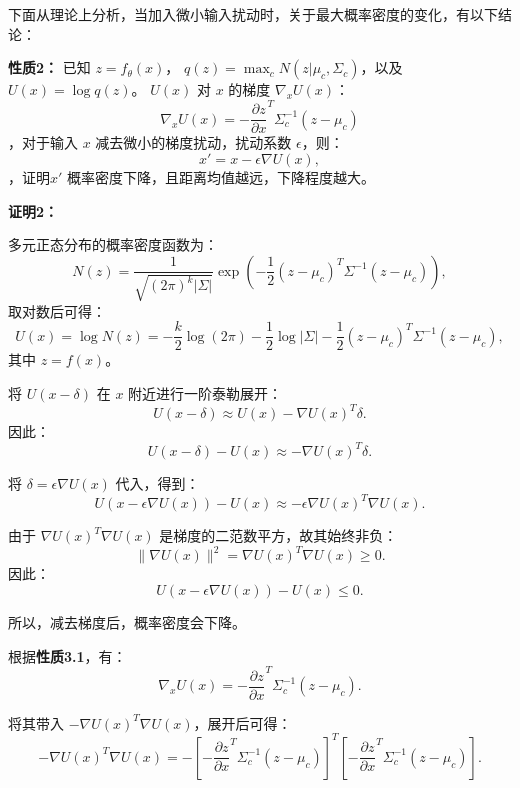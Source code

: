 

下面从理论上分析，当加入微小输入扰动时，关于最大概率密度的变化，有以下结论：

\textbf{性质2：}
已知 \( z = f_\theta(x) \)， \( q(z) = \max_c N(z|\mu_c, \Sigma_c) \)，以及 \( U(x) = \log q(z) \)。 \( U(x) \) 对 \( x \) 的梯度 \( \nabla_x U(x) \)：\[
\nabla_x U(x) = - \frac{\partial z}{\partial x}^T \Sigma_c^{-1} \left( z - \mu_c \right)
\]，对于输入 \( x \) 减去微小的梯度扰动，扰动系数 \( \epsilon \)，则：
\[
x' = x - \epsilon \nabla U(x),
\]，证明\( x' \) 概率密度下降，且距离均值越远，下降程度越大。

\textbf{证明2：}

多元正态分布的概率密度函数为：
\[
N(z) = \frac{1}{\sqrt{(2\pi)^k |\Sigma|}} \exp\left(-\frac{1}{2}(z - \mu_c)^T \Sigma^{-1} (z - \mu_c)\right),
\]
取对数后可得：
\[
U(x) = \log N(z) = -\frac{k}{2} \log(2\pi) - \frac{1}{2} \log |\Sigma| - \frac{1}{2} (z - \mu_c)^T \Sigma^{-1} (z - \mu_c),
\]
其中 \( z = f(x) \)。

将 \( U(x-\delta) \) 在 \( x \) 附近进行一阶泰勒展开：
\[
U(x-\delta) \approx U(x) - \nabla U(x)^T \delta.
\]
因此：
\[
U(x-\delta) - U(x) \approx - \nabla U(x)^T \delta.
\]

将 \( \delta = \epsilon \nabla U(x) \) 代入，得到：
\[
U(x-\epsilon \nabla U(x)) - U(x) \approx - \epsilon \nabla U(x)^T \nabla U(x).
\]

由于 \( \nabla U(x)^T \nabla U(x) \) 是梯度的二范数平方，故其始终非负：
\[
\|\nabla U(x)\|^2 = \nabla U(x)^T \nabla U(x) \geq 0.
\]
因此：
\[
U(x-\epsilon \nabla U(x)) - U(x) \leq 0.
\]

所以，减去梯度后，概率密度会下降。

根据\textbf{性质3.1}，有：
\[
\nabla_x U(x) = - \frac{\partial z}{\partial x}^T \Sigma_c^{-1} \left( z - \mu_c \right).
\]

将其带入 \( -\nabla U(x)^T \nabla U(x) \)，展开后可得：
\[
-\nabla U(x)^T \nabla U(x) = -\left[ -\frac{\partial z}{\partial x}^T \Sigma_c^{-1} \left( z - \mu_c \right) \right]^T \left[ -\frac{\partial z}{\partial x}^T \Sigma_c^{-1} \left( z - \mu_c \right) \right].
\]

